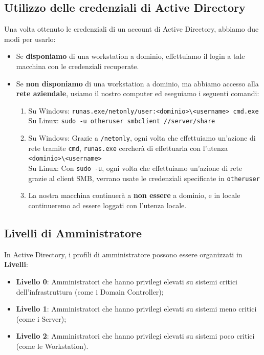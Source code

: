 \documentclass{article}
\begin{document}
\subsection{Utilizzo delle credenziali di Active Directory}
Una volta ottenuto le credenziali di un account di Active Directory, abbiamo due modi per usarlo:
\begin{itemize}
	\item Se \textbf{disponiamo} di una workstation a dominio, effettuiamo il login a tale macchina con le credenziali recuperate.
	\item Se \textbf{non disponiamo} di una workstation a dominio, ma abbiamo accesso alla \textbf{rete aziendale}, usiamo il nostro computer ed eseguiamo i seguenti comandi:
	\begin{enumerate}
		\item Su Windows: \verb|runas.exe/netonly/user:<dominio>\<username> cmd.exe|\\
		Su Linux: \verb|sudo -u otheruser smbclient //server/share|
		
		\item Su Windows: Grazie a \verb|/netonly|, ogni volta che effettuiamo un'azione di rete tramite \verb|cmd|, \verb|runas.exe|
		cercherà di effettuarla con l’utenza \verb|<dominio>\<username>|\\
		Su Linux: Con \verb|sudo -u|, ogni volta che effettuiamo un'azione di rete grazie al client SMB, verrano usate le credenziali specificate in \verb|otheruser|
		
		\item La nostra macchina continuerà a \textbf{non essere} a dominio, e in locale continueremo ad essere loggati con l'utenza locale.
	\end{enumerate}
\end{itemize}

\newpage

\subsection{Livelli di Amministratore}
In Active Directory, i profili di amministratore possono essere organizzati in \textbf{Livelli}:
\begin{itemize}
	\item \textbf{Livello 0}: Amministratori che hanno privilegi elevati su sistemi critici dell’infrastruttura (come i Domain Controller);
	\item \textbf{Livello 1}: Amministratori che hanno privilegi elevati su sistemi meno critici (come i Server);
	\item \textbf{Livello 2}: Amministratori che hanno privilegi elevati su sistemi poco critici (come le Workstation). 
\end{itemize}
\end{document}
